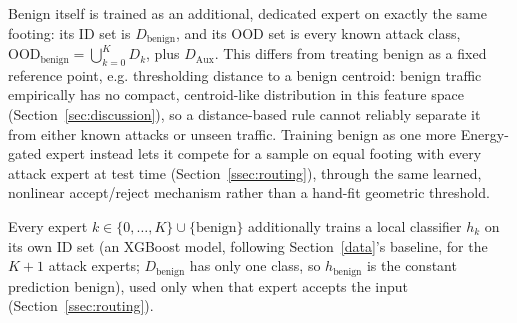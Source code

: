 \documentclass[sigconf]{acmart}
\begin{document}
Benign itself is trained as an additional, dedicated expert on exactly the same footing: its ID set is $D_{\mathrm{benign}}$, and its OOD set is every known attack class, $\text{OOD}_{\mathrm{benign}} = \bigcup_{k=0}^{K} D_k$, plus $D_{\mathrm{Aux}}$. This differs from treating benign as a fixed reference point, e.g. thresholding distance to a benign centroid: benign traffic empirically has no compact, centroid-like distribution in this feature space (Section~\ref{sec:discussion}), so a distance-based rule cannot reliably separate it from either known attacks or unseen traffic. Training benign as one more Energy-gated expert instead lets it compete for a sample on equal footing with every attack expert at test time (Section~\ref{ssec:routing}), through the same learned, nonlinear accept/reject mechanism rather than a hand-fit geometric threshold.

Every expert $k \in \{0, \ldots, K\} \cup \{\mathrm{benign}\}$ additionally trains a local classifier $h_k$ on its own ID set (an XGBoost model, following Section~\ref{data}'s baseline, for the $K{+}1$ attack experts; $D_{\mathrm{benign}}$ has only one class, so $h_{\mathrm{benign}}$ is the constant prediction benign), used only when that expert accepts the input (Section~\ref{ssec:routing}).
\end{document}
